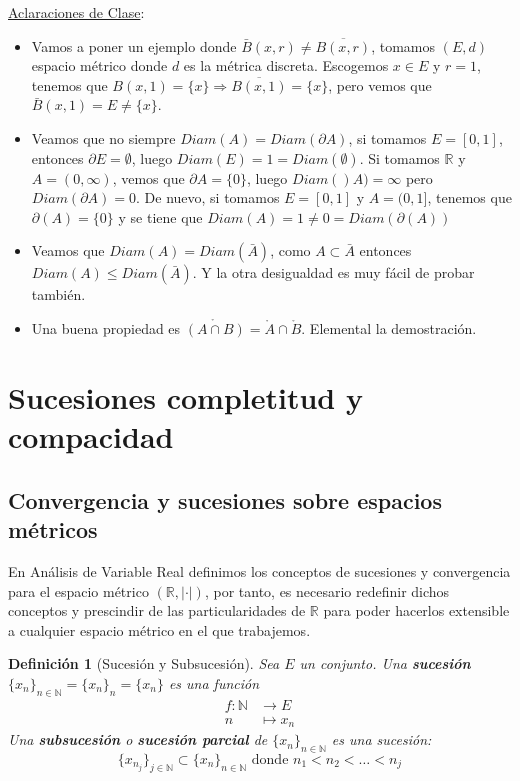 \documentclass[10pt,a4paper,openright]{book}
\theoremstyle{break}
\newtheorem*{defi}{Definición}
\begin{document}
\underline{Aclaraciones de Clase}:
\begin{itemize}
\item Vamos a poner un ejemplo donde $\bar{B}(x,r)\neq \overline{B(x,r)}$, tomamos $(E,d)$ espacio métrico donde $d$ es la métrica discreta. Escogemos $x\in E$ y $r=1$, tenemos que $B(x,1)=\{x\}\Rightarrow \overline{B(x,1)} = \{x\}$, pero vemos que $\bar{B}(x,1) = E \neq \{x\}$.

\item Veamos que no siempre $Diam(A) = Diam (\partial A)$, si tomamos $E=[0,1]$, entonces $\partial E = \emptyset$, luego $Diam (E) =1 = Diam(\emptyset)$. Si tomamos $\mathbb{R}$ y $A=(0,\infty)$, vemos que $\partial A =\{0\}$, luego $Diam()A) = \infty$ pero $Diam (\partial A) = 0$. De nuevo, si tomamos $E=[0,1]$ y $A=(0,1]$, tenemos que $\partial(A) = \{0\}$ y se tiene que $Diam(A) = 1 \neq 0 = Diam (\partial(A))$

\item Veamos que $Diam(A) = Diam (\bar{A})$, como $A\subset \bar{A}$ entonces $Diam(A) \leq Diam (\bar{A})$. Y la otra desigualdad es muy fácil de probar también.

\item Una buena propiedad es $\mathring{(A\cap B)} = \mathring{A} \cap \mathring{B}$. Elemental la demostración.
\end{itemize}

\section{Sucesiones completitud y compacidad}
\subsection{Convergencia y sucesiones sobre espacios métricos}
En Análisis de Variable Real definimos los conceptos de sucesiones y convergencia para el espacio métrico $(\mathbb{R}, |\cdot|)$, por tanto, es necesario redefinir dichos conceptos y prescindir de las particularidades de $\mathbb{R}$ para poder hacerlos extensible a cualquier espacio métrico en el que trabajemos.

\begin{defi}[Sucesión y Subsucesión]
Sea $E$ un conjunto. Una \textbf{sucesión} $\{x_n\}_{n \in \mathbb{N}} = \{x_n\}_n = \{x_n\}$ es una función 
\begin{align*}
f : \mathbb{N} &\to E \\ n &\mapsto x_n
\end{align*}
Una \textbf{subsucesión} o \textbf{sucesión parcial} de $\{x_n\}_{n \in \mathbb{N}}$ es una sucesión:
$$\{x_{n_j}\}_{j \in \mathbb{N}} \subset \{x_n\}_{n \in \mathbb{N}} \mbox{ donde } n_1 < n_2 < \ldots < n_j$$
\end{defi}
\newpage
\end{document}
